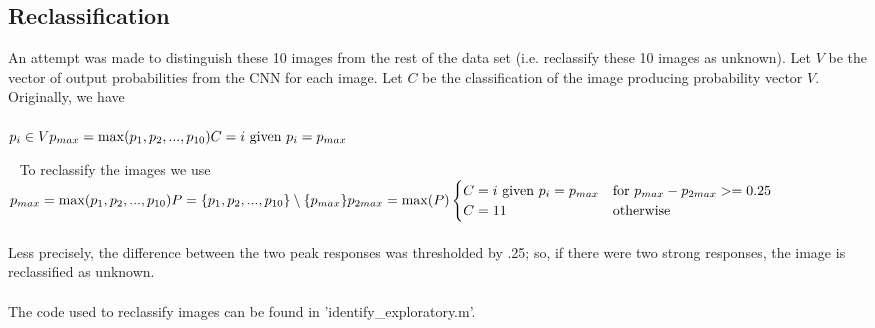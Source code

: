 \documentclass[11pt,english]{article}
\begin{document}
\subsection{Reclassification}
An attempt was made to distinguish these 10 images from the rest of the data set (i.e. reclassify these 10 images as unknown).  Let $V$ be the vector of output probabilities from the CNN for each image.  Let $C$ be the classification of the image producing probability vector $V$.  Originally, we have\\~\\
\begin{math}
p_i \in V \\
p_{max} = \max(p_1, p_2,...,p_{10}) \\
C = i $ given $ p_i = p_{max}
\end{math}

~\newline\noindent
To reclassify the images we use\\
\noindent
\begin{math}
p_{max} = \max(p_1,p_2,...,p_{10}) \\
P = \{p_1,p_2,...,p_{10}\} \setminus \{p_{max}\} \\
p_{2max} = \max(P) \\~\\
\begin{cases}
C = i $ given $ p_i = p_{max} & $for	$ p_{max} - p_{2max} >= 0.25 \\
C = 11 & $otherwise$
\end{cases}
\end{math}
~\\~\\
Less precisely, the difference between the two peak responses was thresholded by .25; so, if there were two strong responses, the image is reclassified as unknown.
~\\~\\
The code used to reclassify images can be found in 'identify\_exploratory.m'.
\end{document}
